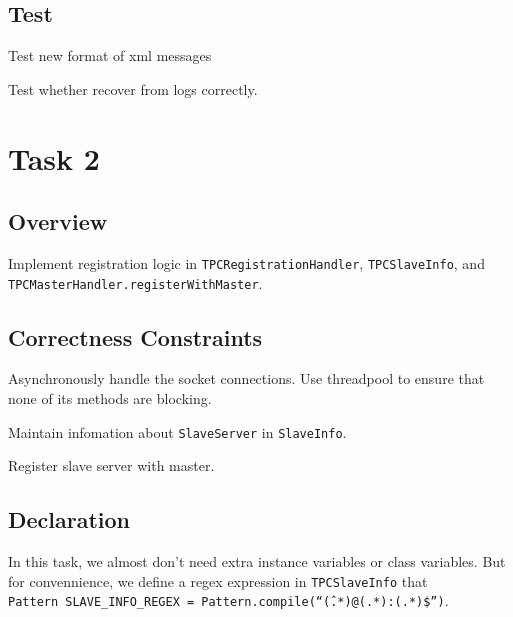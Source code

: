 \documentclass{article}
\begin{document}
\subsection{Test}
\begin{compactitem}
	\item Test new format of xml messages
	\item Test whether recover from logs correctly.
\end{compactitem}

\section{Task 2}
\subsection{Overview}
Implement registration logic in \texttt{TPCRegistrationHandler}, \texttt{TPCSlaveInfo}, and 
\texttt{TPCMasterHandler.registerWithMaster}.
\subsection{Correctness Constraints}
\begin{compactitem}
	\item Asynchronously handle the socket connections. Use threadpool to ensure that none of its methods are
		blocking.
	\item Maintain infomation about \texttt{SlaveServer} in \texttt{SlaveInfo}.
	\item Register slave server with master. 
\end{compactitem}
\subsection{Declaration}
In this task, we almost don't need extra instance variables or class variables. But for convennience,
we define a regex expression in \texttt{TPCSlaveInfo} that  \\
\texttt{Pattern SLAVE\_INFO\_REGEX = Pattern.compile(``\^(.*)@(.*):(.*)\$'')}.
\end{document}
